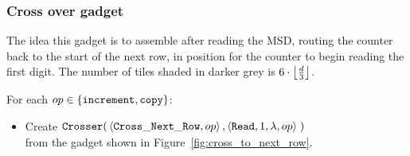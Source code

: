 
\subsubsection{Cross over gadget}

The idea this gadget is to assemble after reading the MSD, routing the counter back to the start of the
next row, in position for the counter to begin reading the first digit.
The number of tiles shaded in darker grey is $6 \cdot \floor*{\frac{d}{3}}$.

\vspace{.5cm}
For each $\inc\in \{ {\tt increment}, {\tt copy} \}$:

\begin{itemize}
    \item Create
    $\begin{aligned}[t]
        {\tt Crosser}(&\left\langle {\tt Cross\_Next\_Row}, \inc \right\rangle,
                       \left\langle {\tt Read}, 1, \lambda, \inc \right\rangle \;)
    \end{aligned}$\\from the gadget shown in Figure~\ref{fig:cross_to_next_row}.
\end{itemize}


